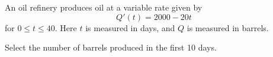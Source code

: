 \documentclass{ximera}
\author{Nela Lakos \and Kyle Parsons}
\begin{document}
\begin{exercise}

An oil refinery produces oil at a variable rate given by
\[
Q'(t) = 2000 - 20t
\]
for $0\leq t\leq40$.  Here $t$ is measured in days, and $Q$ is measured in barrels.

Select the number of barrels produced in the first 10 days.
\begin{multipleChoice}
\end{multipleChoice}

\end{exercise}
\end{document}
